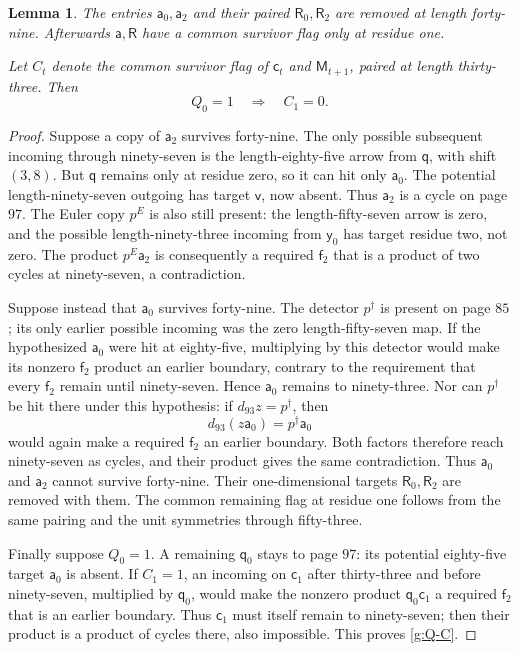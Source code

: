 \documentclass[11pt]{article}
\newtheorem{lemma}[theorem]{Lemma}
\theoremstyle{definition}
\theoremstyle{remark}
\numberwithin{equation}{section}
\begin{document}
\begin{lemma}\label{g:a-removal}
The entries $\mathsf a_0,\mathsf a_2$ and their
paired $\mathsf R_0,\mathsf R_2$ are removed at
length forty-nine.  Afterwards $\mathsf a,\mathsf R$
have a common survivor flag only at residue one.

Let $C_t$ denote the common survivor flag of
$\mathsf c_t$ and $\mathsf M_{t+1}$, paired at
length thirty-three.  Then
\begin{equation}\label{g:Q-C}
 Q_0=1\quad\Longrightarrow\quad C_1=0.
\end{equation}
\end{lemma}

\begin{proof}
Suppose a copy of $\mathsf a_2$ survives forty-nine.
The only possible subsequent incoming through
ninety-seven is the length-eighty-five arrow from
$\mathsf q$, with shift $(3,8)$.  But $\mathsf q$
remains only at residue zero, so it can hit only
$\mathsf a_0$.  The potential length-ninety-seven
outgoing has target $\mathsf v$, now absent.
Thus $\mathsf a_2$ is a cycle on page $97$.
The Euler copy $p^E$ is also still present: the
length-fifty-seven arrow is zero, and the possible
length-ninety-three incoming from $\mathsf y_0$
has target residue two, not zero.  The product
$p^E\mathsf a_2$ is consequently a required
$\mathsf f_2$ that is a product of two cycles at
ninety-seven, a contradiction.

Suppose instead that $\mathsf a_0$ survives forty-nine.
The detector $p^\dagger$ is present on page $85$;
its only earlier possible incoming was the zero
length-fifty-seven map.  If the hypothesized
$\mathsf a_0$ were hit at eighty-five, multiplying
by this detector would make its nonzero
$\mathsf f_2$ product an earlier boundary, contrary
to the requirement that every $\mathsf f_2$ remain
until ninety-seven.  Hence $\mathsf a_0$ remains
to ninety-three.  Nor can $p^\dagger$ be hit there
under this hypothesis: if $d_{93}z=p^\dagger$, then
\[
 d_{93}(z\mathsf a_0)=p^\dagger\mathsf a_0
\]
would again make a required $\mathsf f_2$ an
earlier boundary.  Both factors therefore reach
ninety-seven as cycles, and their product gives the
same contradiction.  Thus $\mathsf a_0$ and
$\mathsf a_2$ cannot survive forty-nine.  Their
one-dimensional targets $\mathsf R_0,\mathsf R_2$
are removed with them.  The common remaining flag
at residue one follows from the same pairing and
the unit symmetries through fifty-three.

Finally suppose $Q_0=1$.  A remaining
$\mathsf q_0$ stays to page $97$: its potential
eighty-five target $\mathsf a_0$ is absent.
If $C_1=1$, an incoming on $\mathsf c_1$ after
thirty-three and before ninety-seven, multiplied by $\mathsf q_0$, would
make the nonzero product $\mathsf q_0\mathsf c_1$
a required $\mathsf f_2$ that is an earlier
boundary.  Thus $\mathsf c_1$ must itself remain
to ninety-seven; then their product is a product
of cycles there, also impossible.  This proves
\eqref{g:Q-C}.
\end{proof}
\end{document}
